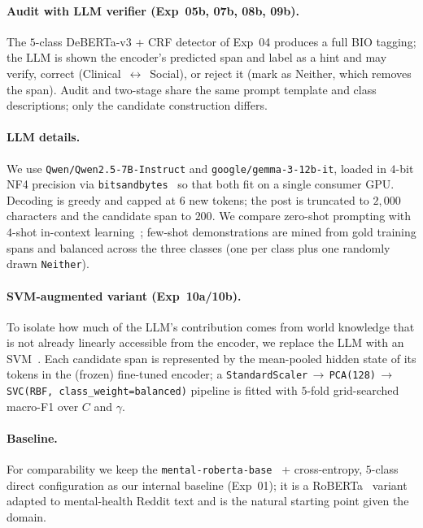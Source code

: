 \documentclass[11pt]{article}
\begin{document}
\paragraph{Audit with LLM verifier (Exp~05b, 07b, 08b, 09b).} The
$5$-class DeBERTa-v3 + CRF detector of Exp~04 produces a full BIO
tagging; the LLM is shown the encoder's predicted span and label as
a hint and may verify, correct (Clinical~$\leftrightarrow$~Social),
or reject it (mark as Neither, which removes the span). Audit and
two-stage share the same prompt template and class
descriptions; only the candidate construction differs.

\paragraph{LLM details.} We use
\texttt{Qwen/Qwen2.5-7B-Instruct} and
\texttt{google/gemma-3-12b-it}, loaded in $4$-bit NF4 precision via
\texttt{bitsandbytes}~\cite{dettmers2023qlora} so that both fit on a
single consumer GPU. Decoding is greedy and capped at $6$ new
tokens; the post is truncated to $2{,}000$ characters and the
candidate span to $200$. We compare zero-shot prompting with
$4$-shot in-context learning~\cite{brown2020fewshot}; few-shot
demonstrations are mined from gold training spans and balanced
across the three classes (one per class plus one randomly drawn
\texttt{Neither}).

\paragraph{SVM-augmented variant (Exp~10a/10b).} To isolate how much
of the LLM's contribution comes from world knowledge that is not
already linearly accessible from the encoder, we replace the LLM
with an SVM~\cite{cortes1995svm}. Each candidate span is represented
by the mean-pooled hidden state of its tokens in the (frozen)
fine-tuned encoder; a
\texttt{StandardScaler}\,$\rightarrow$\,\texttt{PCA(128)}\,$\rightarrow$\,\texttt{SVC(RBF, class\_weight=balanced)}
pipeline is fitted with $5$-fold grid-searched macro-F1 over $C$
and $\gamma$.

\paragraph{Baseline.} For comparability we keep the
\texttt{mental-roberta-base}~\cite{ji2022mentalbert} +
cross-entropy, $5$-class direct configuration as our internal
baseline (Exp~01); it is a RoBERTa~\cite{liu2019roberta} variant
adapted to mental-health Reddit text and is the natural starting
point given the domain.
\end{document}

